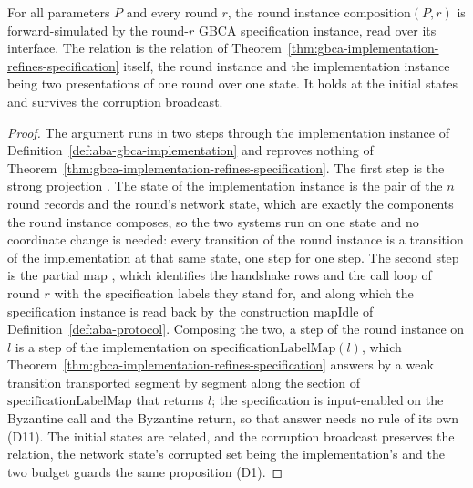 \begin{theorem}
  \label{thm:aba-gbca-instance-refines-specification}
  \leanok
  For all parameters $P$ and every round $r$, the round instance $\mathrm{composition}(P,r)$ is forward-simulated by the round-$r$ GBCA specification instance, read over its interface.
  The relation is the relation of Theorem~\ref{thm:gbca-implementation-refines-specification} itself, the round instance and the implementation instance being two presentations of one round over one state.
  It holds at the initial states and survives the corruption broadcast.
\end{theorem}

\begin{proof}\leanok
  The argument runs in two steps through the implementation instance of Definition~\ref{def:aba-gbca-implementation} and reproves nothing of Theorem~\ref{thm:gbca-implementation-refines-specification}.
  The first step is the strong projection .
  The state of the implementation instance is the pair of the $n$ round records and the round's network state, which are exactly the components the round instance composes, so the two systems run on one state and no coordinate change is needed: every transition of the round instance is a transition of the implementation at that same state, one step for one step.
  The second step is the partial map , which identifies the handshake rows and the call loop of round $r$ with the specification labels they stand for, and along which the specification instance is read back by the construction $\mathrm{mapIdle}$ of Definition~\ref{def:aba-protocol}.
  Composing the two, a step of the round instance on $l$ is a step of the implementation on $\mathrm{specificationLabelMap}(l)$, which Theorem~\ref{thm:gbca-implementation-refines-specification} answers by a weak transition transported segment by segment along the section of $\mathrm{specificationLabelMap}$ that returns $l$; the specification is input-enabled on the Byzantine call and the Byzantine return, so that answer needs no rule of its own (D11).
  The initial states are related, and the corruption broadcast preserves the relation, the network state's corrupted set being the implementation's and the two budget guards the same proposition (D1).
\end{proof}
